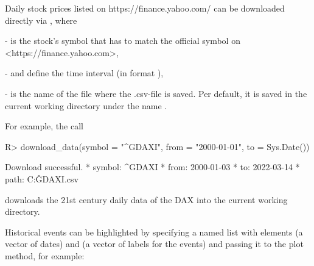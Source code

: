 \documentclass[article]{jss}
\begin{document}
Daily stock prices listed on https://finance.yahoo.com/ can be downloaded directly via , where

-  is the stock's symbol that has to match the official symbol on <https://finance.yahoo.com>,

-  and  define the time interval (in format ),

-  is the name of the file where the .csv-file is saved. Per default, it is saved in the current working directory under the name .

For example, the call

%
\begin{Schunk}
\begin{Sinput}
R> download_data(symbol = "^GDAXI", from = "2000-01-01", to = Sys.Date())
\end{Sinput}
\begin{Soutput}
Download successful.
* symbol: ^GDAXI 
* from: 2000-01-03 
* to: 2022-03-14 
* path: C:\Users\Lennart\Projekte\fHMM\jss\^GDAXI.csv
\end{Soutput}
\end{Schunk}
%

downloads the 21st century daily data of the DAX into the current working directory.

Historical events can be highlighted by specifying a named list  with elements  (a vector of dates) and  (a vector of labels for the events) and passing it to the plot method, for example:
\end{document}
